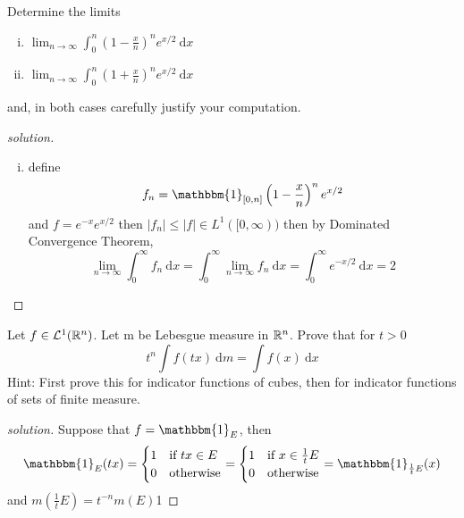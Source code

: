 \begin{problem}
  Determine the limits 
  \begin{enumerate}[(i)]
    \item $\lim_{n\to\infty} \int_0^n (1 - \frac xn)^n e^{x/2}\ \mathrm{d}x$
    \item $\lim_{n\to\infty} \int_0^n (1 + \frac xn)^n e^{x/2}\ \mathrm{d}x$
  \end{enumerate}
  and, in both cases carefully justify your computation.
\end{problem}
\begin{proof}[solution]
   \begin{enumerate}[(i)]
    \item define \[f_n = \mathbbm{1}_{[0, n]} \left(1 - \frac xn\right)^n e^{x/2}\]
    and $f = e^{-x}e^{x/2}$
    then $|f_n| \le |f| \in L^1([0, \infty))$ then by Dominated Convergence Theorem,
    \[\lim_{n\to\infty}\int_{0}^\infty f_n\ \mathrm{d}x = \int_{0}^\infty\lim_{n\to\infty} f_n\ \mathrm{d}x = \int_0^\infty e^{-x/2}\ \mathrm{d}x = 2\]
   \end{enumerate}
\end{proof}

\begin{problem}
  Let $f \in \mathcal{L}^1(\mathbb R^n)$. Let m be Lebesgue measure in $\mathbb R^n$. Prove that for $t > 0$
  \[t^n \int f(tx)\ \mathrm{d}m = \int f(x)\ \mathrm{d}x\]
Hint: First prove this for indicator functions of cubes, then for indicator
functions of sets of finite measure.
\end{problem}

\begin{proof}[solution]
  Suppose that $f = \mathbbm{1}_E$, then
  \[\mathbbm{1}_E(tx) = \begin{cases}
    1 & \text{if } tx \in E\\
    0 & \text{otherwise}
  \end{cases} = \begin{cases}
    1 & \text{if } x \in \frac1tE\\
    0 & \text{otherwise}
  \end{cases} = \mathbbm{1}_{\frac1tE}(x)\] 
  and $m(\frac1tE) = t^{-n}m(E)$1
\end{proof}


